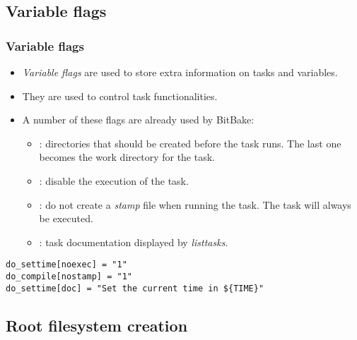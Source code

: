 \subsection{Variable flags}

\begin{frame}[fragile]
  \frametitle{Variable flags}
  \begin{itemize}
    \item {\em Variable flags} are used to store extra information on
      tasks and variables.
    \item They are used to control task functionalities.
    \item A number of these flags are already used by BitBake:
      \begin{itemize}
        \item {}: directories that should be created before the
          task runs. The last one becomes the work directory for the
          task.
        \item {}: disable the execution of the task.
        \item {}: do not create a {\em stamp} file when
          running the task. The task will always be executed.
        \item {}: task documentation displayed by {\em
          listtasks}.
      \end{itemize}
  \end{itemize}
  \begin{verbatim}
do_settime[noexec] = "1"
do_compile[nostamp] = "1"
do_settime[doc] = "Set the current time in ${TIME}"
  \end{verbatim}
\end{frame}

\subsection{Root filesystem creation}

